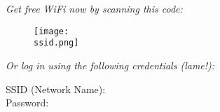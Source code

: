 \documentclass[a4paper,12pt]{article}
\newlength{\credlen}
\begin{document}
\begin{center}
  \textsl{\Large Get free WiFi now by scanning this code:}
\end{center}
\begin{figure}[h]
\centering
\texttt{[image: \\ssid.png]}
\end{figure}

\begin{center}
\begin{minipage}{\credlen}
\noindent \textsl{Or log in using the following credentials (lame!):}

\begin{tabbing}
  SSID (Network Name):\, \= \textbf{\ssid}
  \vspace{2pt}\\
  Password: \> \textbf{\pw}\\
\end{tabbing}
\end{minipage}
\end{center}
\end{document}
